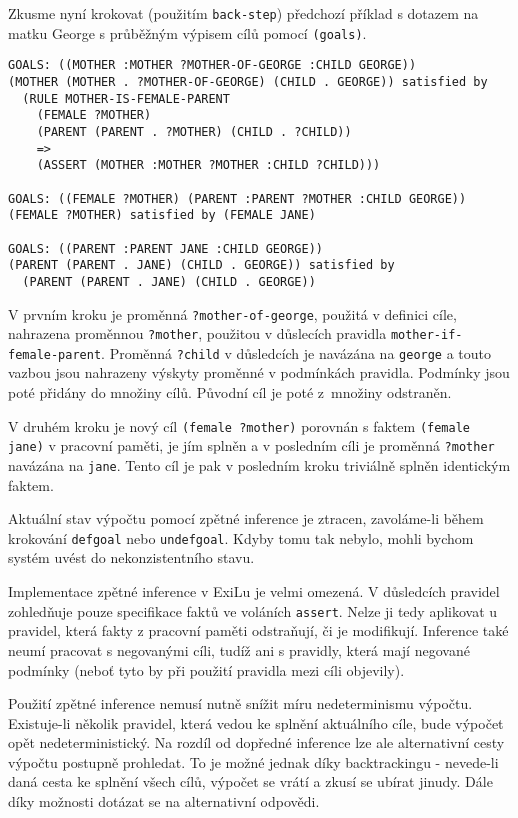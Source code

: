 Zkusme nyní krokovat (použitím \verb|back-step|) předchozí příklad s dotazem na
matku George s průběžným výpisem cílů pomocí \verb|(goals)|.
\begin{verbatim}
GOALS: ((MOTHER :MOTHER ?MOTHER-OF-GEORGE :CHILD GEORGE))
(MOTHER (MOTHER . ?MOTHER-OF-GEORGE) (CHILD . GEORGE)) satisfied by
  (RULE MOTHER-IS-FEMALE-PARENT
    (FEMALE ?MOTHER)
    (PARENT (PARENT . ?MOTHER) (CHILD . ?CHILD))
    =>
    (ASSERT (MOTHER :MOTHER ?MOTHER :CHILD ?CHILD)))

GOALS: ((FEMALE ?MOTHER) (PARENT :PARENT ?MOTHER :CHILD GEORGE))
(FEMALE ?MOTHER) satisfied by (FEMALE JANE)

GOALS: ((PARENT :PARENT JANE :CHILD GEORGE))
(PARENT (PARENT . JANE) (CHILD . GEORGE)) satisfied by
  (PARENT (PARENT . JANE) (CHILD . GEORGE))
\end{verbatim}
V prvním kroku je proměnná \verb|?mother-of-george|, použitá v definici cíle,
nahrazena proměnnou \verb|?mother|, použitou v důslecích pravidla
\verb|mother-if-female-parent|. Proměnná \verb|?child| v důsledcích je navázána
na \verb|george| a touto vazbou jsou nahrazeny výskyty proměnné v podmínkách
pravidla. Podmínky jsou poté přidány do množiny cílů. Původní cíl je poté
z~množiny odstraněn.

V druhém kroku je nový cíl \verb|(female ?mother)| porovnán s faktem
\verb|(female jane)| v pracovní paměti, je jím splněn a v posledním cíli je
proměnná \verb|?mother| navázána na \verb|jane|. Tento cíl je pak
v posledním kroku triviálně splněn identickým faktem.

Aktuální stav výpočtu pomocí zpětné inference je ztracen, zavoláme-li během
krokování \verb|defgoal| nebo \verb|undefgoal|. Kdyby tomu tak nebylo, mohli
bychom systém uvést do nekonzistentního stavu.

Implementace zpětné inference v ExiLu je velmi omezená. V důsledcích pravidel
zohledňuje pouze specifikace faktů ve voláních \verb|assert|. Nelze ji tedy
aplikovat u pravidel, která fakty z pracovní paměti odstraňují, či je
modifikují. Inference také neumí pracovat s negovanými cíli, tudíž ani s
pravidly, která mají negované podmínky (neboť tyto by při použití pravidla
mezi cíli objevily).

Použití zpětné inference nemusí nutně snížit míru nedeterminismu výpočtu.
Existuje-li několik pravidel, která vedou ke splnění aktuálního cíle, bude
výpočet opět nedeterministický. Na rozdíl od dopředné inference lze ale
alternativní cesty výpočtu postupně prohledat. To je možné jednak díky
backtrackingu - nevede-li daná cesta ke splnění všech cílů, výpočet se vrátí a
zkusí se ubírat jinudy. Dále díky možnosti dotázat se na alternativní odpovědi.
